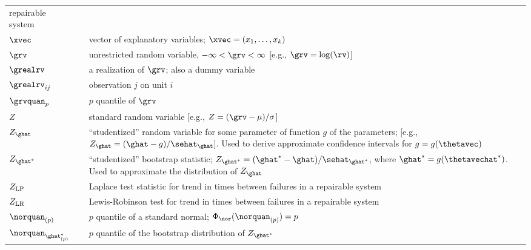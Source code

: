 \begin{supertabular}{p{0.9in}lp{4.0in}}
repairable system
  \\
$\xvec$    & 
& vector of explanatory variables;
 $\xvec=(x_{1}, \ldots, x_{k})$
   \\
$\grv$       & 
&unrestricted random variable, $-\infty<\grv<\infty$
[e.g., $\grv=\log(\rv)$]
    \\
$\grealrv$   & 
&a realization of $\grv$; also a dummy variable
   \\
$\grealrv_{ij}$   & 
&observation $j$ on unit $i$
    \\
$\grvquan_{p}$   & 
&  $p$ quantile of $\grv$
    \\
$Z$ &
& standard random variable [e.g., $Z=(\grv-\mu)/\sigma$]
     \\
$Z_{\ghat}$ &
& ``studentized'' random variable for some 
parameter of function $g$ of the parameters;
[e.g., $Z_{\ghat}=(\ghat-g)/\sehat_{\ghat}$]. Used 
to derive approximate confidence intervals for $g=g(\thetavec)$
     \\
$Z_{\ghat^{*}}$ &
& ``studentized'' bootstrap statistic;
$Z_{\ghat^{*}}=(\ghat^{*}-\ghat)/\sehat_{\ghat^{*}}$,
where $\ghat^{*}=g(\thetavechat^{*})$.
Used to approximate the distribution of $Z_{\ghat}$
    \\
$Z_{\rm LP}$ &
& 
Laplace test statistic for trend in times between failures in a
repairable system
    \\
$Z_{\rm LR}$ &
& 
Lewis-Robinson test for trend in times between failures in a
repairable system
    \\
$\norquan_{(p)}$    & 
&$p$ quantile  of a standard normal;
$\Phi_{\nor}(\norquan_{(p)})=p$
   \\
$\norquan_{\ghat^{*}_{(p)}}$    & 
& $p$ quantile  of the bootstrap distribution of $Z_{\ghat^{*}}$
\\
\end{supertabular}


